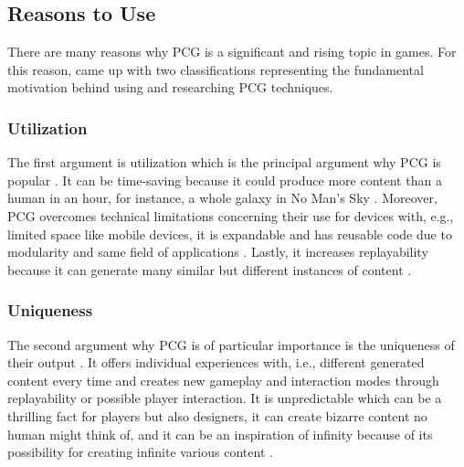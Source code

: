 \documentclass[MGS,Master,english]{twbook}%
\begin{document}
\subsection{Reasons to Use}
There are many reasons why PCG is a significant and rising topic in games. For this reason, \citep{pcg::inGameDesign} came up with two classifications representing the fundamental motivation behind using and researching PCG techniques.

\subsubsection{Utilization}
The first argument is utilization which is the principal argument why PCG is popular \cite{pcg::inGameDesign}. It can be time-saving because it could produce more content than a human in an hour, for instance, a whole galaxy in No Man’s Sky \cite{game::noMansSky} \cite{pcg::inGameDesign}. Moreover, PCG overcomes technical limitations concerning their use for devices with, e.g., limited space like mobile devices, it is expandable and has reusable code due to modularity and same field of applications \cite{pcg::inGameDesign}. Lastly, it increases replayability because it can generate many similar but different instances of content \cite{pcg::inGameDesign}.

\subsubsection{Uniqueness}
The second argument why PCG is of particular importance is the uniqueness of their output \cite{pcg::inGameDesign}. It offers individual experiences with, i.e., different generated content every time and creates new gameplay and interaction modes through replayability or possible player interaction. It is unpredictable which can be a thrilling fact for players but also designers, it can create bizarre content no human might think of, and it can be an inspiration of infinity because of its possibility for creating infinite various content \cite{pcg::inGameDesign}.
\end{document}
